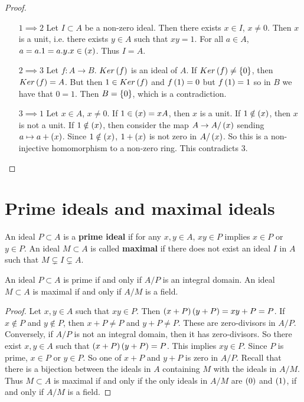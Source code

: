 \begin{proof}
\hfill
\begin{itemize}[leftmargin=0.5in]
\item[$ 1 \implies 2 $] Let $ I \subset A $ be a non-zero ideal. Then there exists $ x \in I $, $ x \ne 0 $. Then $ x $ is a unit, i.e. there exists $ y \in A $ such that $ xy = 1 $. For all $ a \in A $, $ a = a.1 = a.y.x \in \br{x} $. Thus $ I = A $.
\item[$ 2 \implies 3 $] Let $ f : A \to B $. $ Ker\br{f} $ is an ideal of $ A $. If $ Ker\br{f} \ne \cbr{0} $, then $ Ker\br{f} = A $. But then $ 1 \in Ker\br{f} $ and $ f\br{1} = 0 $ but $ f\br{1} = 1 $ so in $ B $ we have that $ 0 = 1 $. Then $ B = \cbr{0} $, which is a contradiction.
\item[$ 3 \implies 1 $] Let $ x \in A $, $ x \ne 0 $. If $ 1 \in \br{x} = xA $, then $ x $ is a unit. If $ 1 \notin \br{x} $, then $ x $ is not a unit. If $ 1 \notin \br{x} $, then consider the map $ A \to A / \br{x} $ sending $ a \mapsto a + \br{x} $. Since $ 1 \notin \br{x} $, $ 1 + \br{x} $ is not zero in $ A / \br{x} $. So this is a non-injective homomorphism to a non-zero ring. This contradicts $ 3 $.
\end{itemize}
\end{proof}

\pagebreak

\section{Prime ideals and maximal ideals}

\begin{definition}
An ideal $ P \subset A $ is a \textbf{prime ideal} if for any $ x, y \in A $, $ xy \in P $ implies $ x \in P $ or $ y \in P $. An ideal $ M \subset A $ is called \textbf{maximal} if there does not exist an ideal $ I $ in $ A $ such that $ M \subsetneq I \subsetneq A $.
\end{definition}

\begin{lemma}
An ideal $ P \subset A $ is prime if and only if $ A / P $ is an integral domain. An ideal $ M \subset A $ is maximal if and only if $ A / M $ is a field.
\end{lemma}

\begin{proof}
Let $ x, y \in A $ such that $ xy \in P $. Then $ \br{x + P}\br{y + P} = xy + P = P $. If $ x \notin P $ and $ y \notin P $, then $ x + P \ne P $ and $ y + P \ne P $. These are zero-divisors in $ A / P $. Conversely, if $ A / P $ is not an integral domain, then it has zero-divisors. So there exist $ x, y \in A $ such that $ \br{x + P}\br{y + P} = P $. This implies $ xy \in P $. Since $ P $ is prime, $ x \in P $ or $ y \in P $. So one of $ x + P $ and $ y + P $ is zero in $ A / P $. Recall that there is a bijection between the ideals in $ A $ containing $ M $ with the ideals in $ A / M $. Thus $ M \subset A $ is maximal if and only if the only ideals in $ A / M $ are $ \br{0} $ and $ \br{1} $, if and only if $ A / M $ is a field.
\end{proof}


